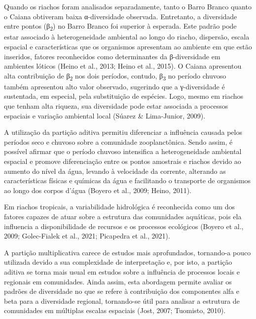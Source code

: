 \documentclass[
  letterpaper,
  DIV=11,
  numbers=noendperiod]{scrartcl}
\begin{document}
Quando os riachos foram analisados separadamente, tanto o Barro Branco
quanto o Caiana obtiveram baixa α-diversidade observada. Entretanto, a
diversidade entre pontos (β\textsubscript{2}) no Barro Branco foi
superior à esperada. Este padrão pode estar associado à heterogeneidade
ambiental ao longo do riacho, dispersão, escala espacial e
características que os organismos apresentam ao ambiente em que estão
inseridos, fatores reconhecidos como determinantes da β-diversidade em
ambientes lóticos (Heino et al., 2013; Heino et al., 2015). O Caiana
apresentou alta contribuição de β\textsubscript{2} nos dois períodos,
contudo, β\textsubscript{3} no período chuvoso também apresentou alto
valor observado, sugerindo que a γ-diversidade é sustentada, em
especial, pela substituição de espécies. Logo, mesmo em riachos que
tenham alta riqueza, sua diversidade pode estar associada a processos
espaciais e variação ambiental local (Súarez \& Lima-Junior, 2009).

A utilização da partição aditiva permitiu diferenciar a influência
causada pelos períodos seco e chuvoso sobre a comunidade zooplanctônica.
Sendo assim, é possível afirmar que o período chuvoso intensifica a
heterogeneidade ambiental espacial e promove diferenciação entre os
pontos amostrais e riachos devido ao aumento do nível da água, levando à
velocidade da corrente, alterando as características físicas e químicas
da água e facilitando o transporte de organismos ao longo dos corpos
d'água (Boyero et al., 2009; Heino, 2011).

Em riachos tropicais, a variabilidade hidrológica é reconhecida como um
dos fatores capazes de atuar sobre a estrutura das comunidades
aquáticas, pois ela influencia a disponibilidade de recursos e os
processos ecológicos (Boyero et al., 2009; Golec-Fialek et al., 2021;
Picapedra et al., 2021).

A partição multiplicativa carece de estudos mais aprofundados,
tornando-a pouco utilizada devido a sua complexidade de interpretação e,
por isto, a partição aditiva se torna mais usual em estudos sobre a
influência de processos locais e regionais em comunidades. Ainda assim,
esta abordagem permite avaliar os padrões de diversidade no que se
refere à contribuição dos componentes alfa e beta para a diversidade
regional, tornando-se útil para analisar a estrutura de comunidades em
múltiplas escalas espaciais (Jost, 2007; Tuomisto, 2010).
\end{document}
